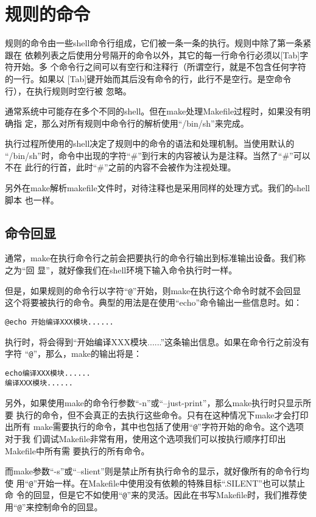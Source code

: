 ﻿\chapter{规则的命令}
规则的命令由一些shell命令行组成，它们被一条一条的执行。规则中除了第一条紧跟在
依赖列表之后使用分号隔开的命令以外，其它的每一行命令行必须以[Tab]字符开始。多
个命令行之间可以有空行和注释行（所谓空行，就是不包含任何字符的一行。如果以
[Tab]键开始而其后没有命令的行，此行不是空行。是空命令行），在执行规则时空行被
忽略。

通常系统中可能存在多个不同的shell。但在make处理Makefile过程时，如果没有明确指
定，那么对所有规则中命令行的解析使用“/bin/sh”来完成。

执行过程所使用的shell决定了规则中的命令的语法和处理机制。当使用默认的
“/bin/sh”时，命令中出现的字符“\#”到行末的内容被认为是注释。当然了“\#”可以不在
此行的行首，此时“\#”之前的内容不会被作为注视处理。

另外在make解析makefile文件时，对待注释也是采用同样的处理方式。我们的shell脚本
也一样。

\section{命令回显}
通常，make在执行命令行之前会把要执行的命令行输出到标准输出设备。我们称之为“回
显”，就好像我们在shell环境下输入命令执行时一样。

但是，如果规则的命令行以字符“\verb"@"”开始，则make在执行这个命令时就不会回显
这个将要被执行的命令。典型的用法是在使用“echo”命令输出一些信息时。如：

\begin{Verbatim}[]
@echo 开始编译XXX模块......
\end{Verbatim}


执行时，将会得到“开始编译XXX模块......”这条输出信息。如果在命令行之前没有字符
“\verb"@"”，那么，make的输出将是：

\begin{Verbatim}[]
echo编译XXX模块......
编译XXX模块......
\end{Verbatim}

另外，如果使用make的命令行参数“-n”或“--just-print”，那么make执行时只显示所要
执行的命令，但不会真正的去执行这些命令。只有在这种情况下make才会打印出所有
make需要执行的命令，其中也包括了使用“\verb"@"”字符开始的命令。这个选项对于我
们调试Makefile非常有用，使用这个选项我们可以按执行顺序打印出Makefile中所有需
要执行的所有命令。

而make参数“-s”或“--slient”则是禁止所有执行命令的显示，就好像所有的命令行均使
用“\verb"@"”开始一样。在Makefile中使用没有依赖的特殊目标“.SILENT”也可以禁止命
令的回显，但是它不如使用“\verb"@"”来的灵活。因此在书写Makefile时，我们推荐使
用“\verb"@"”来控制命令的回显。

